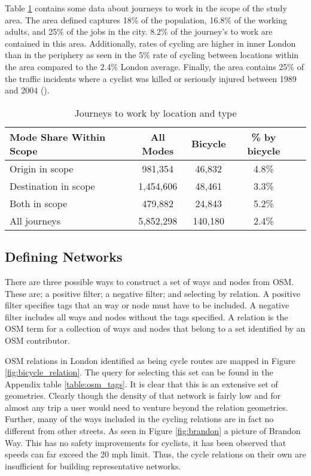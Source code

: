 Table \ref{table:commute_data} contains some data about journeys to work in the scope of the study area. The area defined captures 18\% of the population, 16.8\% of the working adults, and 25\% of the jobs in the city. 8.2\% of the journey's to work are contained in this area. Additionally, rates of cycling are higher in inner London than in the periphery as seen in the 5\% rate of cycling between locations within the area compared to the 2.4\% London average. Finally, the area contains 25\% of the traffic incidents where a cyclist was killed or seriously injured between 1989 and 2004 (\cite{cyclistksi}). 
 
\begin{table}[]
\centering
\begin{tabular}{lcccl}
 Mode Share Within Scope & All Modes & Bicycle & \% by bicycle &  \\
 \hline
 Origin in scope &  981,354 & 46,832 & 4.8\% &  \\
 Destination in scope & 1,454,606 & 48,461 & 3.3\% &  \\
 Both in scope & 479,882 & 24,843 & 5.2\% & \\
 All journeys & 5,852,298 & 140,180 & 2.4\% \\ 
\end{tabular}
\caption{Journeys to work by location and type}
\label{table:commute_data}
\end{table}

\subsection{Defining Networks}

There are three possible ways to construct a set of ways and nodes from OSM. These are; a positive filter; a negative filter; and selecting by relation. A positive filter specifies tags that an way or node must have to be included. A negative filter includes all ways and nodes without the tags specified. A relation is the OSM term for a collection of ways and nodes that belong to a set identified by an OSM contributor. 

OSM relations in London identified as being cycle routes are mapped in Figure \ref{fig:bicycle_relation}. The query for selecting this set can be found in the Appendix table \ref{table:osm_tags}. It is clear that this is an extensive set of geometries. Clearly though the density of that network is fairly low and for almost any trip a user would need to venture beyond the relation geometries. Further, many of the ways included in the cycling relations are in fact no different from other streets. As seen in Figure \ref{fig:brandon} a picture of Brandon Way. This has no safety improvements for cyclists, it has been observed that speeds can far exceed the 20 mph limit. Thus, the cycle relations on their own are insufficient for building representative networks. 


